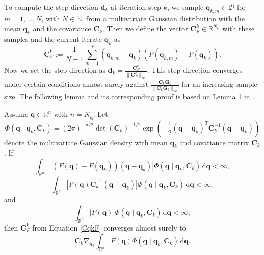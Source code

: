 To compute the step direction $\mathbf{d}_k$ at iteration step $k$, we sample $\mathbf{q}_{k,m}\in\mathcal{D}$ for $m=1,\dotsc,N$, with $N\in\mathbb{N}$, from a multivariate Gaussian distribution with the mean $\mathbf{q}_k$ and the covariance $\mathbf{C}_k$. Then we define the vector $\mathbf{C}_F^k\in\mathbb{R}^{N_\mathbf{q}}$ with these samples and the current iterate $\mathbf{q}_k$ as
\begin{equation}
\label{CqkF}
\mathbf{C}_F^k:=\frac{1}{N-1}\sum_{m=1}^N(\mathbf{q}_{k,m}-\mathbf{q}_k)(F(\mathbf{q}_{k,m})-F(\mathbf{q}_k)).
\end{equation}
Now we set the step direction as $\mathbf{d}_k=\frac{\mathbf{C}_F^k}{\|\mathbf{C}_F^k\|_\infty}$. This step direction converges under certain conditions almost surely against $\frac{\mathbf{C}_k\mathbf{G}_k}{\|\mathbf{C}_k\mathbf{G}_k\|_\infty}$ for an increasing sample size. The following lemma and its corresponding proof is based on Lemma 1 in \cite{Stordal2016-cj}.
\begin{lem}
Assume $\mathbf{q}\in\mathbb{R}^n$ with $n=N_\mathbf{q}$. Let
\begin{equation*}
\Phi(\mathbf{q}\mid \mathbf{q}_k, \mathbf{C}_k)=(2\pi)^{-n/2}\det(\mathbf{C}_k)^{-1/2}\exp\left(-\frac{1}{2}(\mathbf{q}-\mathbf{q}_k)^T\mathbf{C}^{-1}_k(\mathbf{q}-\mathbf{q}_k)\right)
\end{equation*}
denote the multivariate Gaussian density with mean $\mathbf{q}_k$ and covariance matrix $\mathbf{C}_k$. If
\begin{equation}
\label{lemmaCFKCondition}
\int_{\mathbb{R}^n}\left|(F(\mathbf{q})-F(\mathbf{q}_k))(\mathbf{q}-\mathbf{q}_k)\right|\Phi(\mathbf{q}\mid \mathbf{q}_k, \mathbf{C}_k)\,\mathrm{d}\mathbf{q}<\infty,
\end{equation}
\begin{equation}
\label{lemmaCFKCondition2}
\int_{\mathbb{R}^n}|F(\mathbf{q})\mathbf{C}^{-1}_k(\mathbf{q}-\mathbf{q}_k)|\Phi(\mathbf{q}\mid \mathbf{q}_k, \mathbf{C}_k)\,\mathrm{d}\mathbf{q}<\infty,
\end{equation}
and
\begin{equation}
\label{lemmaCFKCondition3}
\int_{\mathbb{R}^n}|F(\mathbf{q})|\Phi(\mathbf{q}\mid \mathbf{q}_k, \mathbf{C}_k)\,\mathrm{d}\mathbf{q}<\infty,
\end{equation}
then $\mathbf{C}_F^k$ from Equation \eqref{CqkF} converges almost surely to
\begin{equation*}
\mathbf{C}_k\nabla_{\mathbf{q}_k}\int_{\mathbb{R}^n}F(\mathbf{q})\Phi(\mathbf{q}\mid \mathbf{q}_k, \mathbf{C}_k)\,\mathrm{d}\mathbf{q}.
\end{equation*}
\end{lem}
